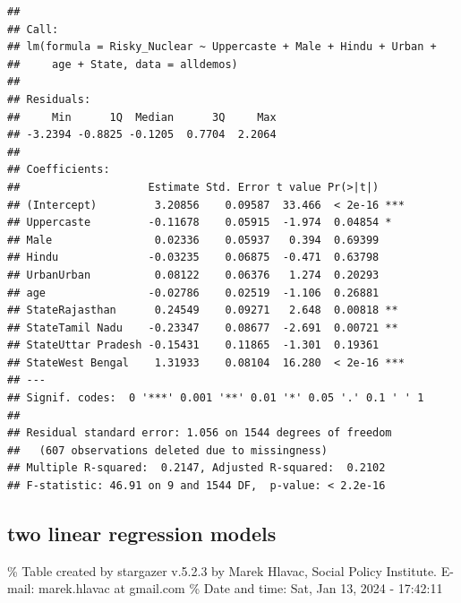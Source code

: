 \documentclass[
]{article}
\begin{document}
\begin{verbatim}
## 
## Call:
## lm(formula = Risky_Nuclear ~ Uppercaste + Male + Hindu + Urban + 
##     age + State, data = alldemos)
## 
## Residuals:
##     Min      1Q  Median      3Q     Max 
## -3.2394 -0.8825 -0.1205  0.7704  2.2064 
## 
## Coefficients:
##                    Estimate Std. Error t value Pr(>|t|)    
## (Intercept)         3.20856    0.09587  33.466  < 2e-16 ***
## Uppercaste         -0.11678    0.05915  -1.974  0.04854 *  
## Male                0.02336    0.05937   0.394  0.69399    
## Hindu              -0.03235    0.06875  -0.471  0.63798    
## UrbanUrban          0.08122    0.06376   1.274  0.20293    
## age                -0.02786    0.02519  -1.106  0.26881    
## StateRajasthan      0.24549    0.09271   2.648  0.00818 ** 
## StateTamil Nadu    -0.23347    0.08677  -2.691  0.00721 ** 
## StateUttar Pradesh -0.15431    0.11865  -1.301  0.19361    
## StateWest Bengal    1.31933    0.08104  16.280  < 2e-16 ***
## ---
## Signif. codes:  0 '***' 0.001 '**' 0.01 '*' 0.05 '.' 0.1 ' ' 1
## 
## Residual standard error: 1.056 on 1544 degrees of freedom
##   (607 observations deleted due to missingness)
## Multiple R-squared:  0.2147, Adjusted R-squared:  0.2102 
## F-statistic: 46.91 on 9 and 1544 DF,  p-value: < 2.2e-16
\end{verbatim}

\hypertarget{two-linear-regression-models}{%
\subsection{two linear regression
models}\label{two-linear-regression-models}}

\begingroup\setlength{\tabcolsep}{1pt}\renewcommand{\arraystretch}{0.7}

\% Table created by stargazer v.5.2.3 by Marek Hlavac, Social Policy
Institute. E-mail: marek.hlavac at gmail.com \% Date and time: Sat, Jan
13, 2024 - 17:42:11
\end{document}

